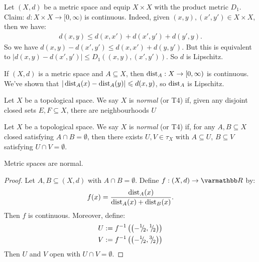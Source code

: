     \begin{example}
        Let $(X,d)$ be a metric space and equip $X \times X$ with the product metric $D_1$. Claim: $d:X \times X \rightarrow [0,\infty)$ is continuous. Indeed, given $(x,y),(x',y') \in X \times X$, then we have:
            \begin{equation*}
            \begin{split}
                d(x,y) \leq d(x,x') + d(x',y') + d(y',y).
            \end{split}
            \end{equation*}
        So we have $d(x,y) - d(x',y') \leq d(x,x') + d(y,y')$. But this is equivalent to $|d(x,y) - d(x',y')| \leq D_1((x,y),(x',y'))$. So $d$ is Lipschitz.
    \end{example}

    \begin{example}
        If $(X,d)$ is a metric space and $A \subseteq X$, then $\operatorname{dist}_A : X \rightarrow [0,\infty)$ is continuous. We've shown that $|\operatorname{dist}_A(x) - \operatorname{dist}_A(y)| \leqslant d(x,y)$, so $\operatorname{dist}_A$ is Lipschitz.
    \end{example}

    \begin{definition}
        Let $X$ be a topological space. We say $X$ is \textit{normal} (or T4) if, given any disjoint closed sets $E,F \subseteq X$, there are neighbourhoods $U$
    \end{definition}

    \begin{definition}
        Let $X$ be a topological space. We say $X$ is \textit{normal} (or T4) if, for any $A,B \subseteq X$ closed satisfying $A \cap B = \emptyset$, then there exists $U,V \in \tau_X$ with $A \subseteq U$, $B \subseteq V$ satisfying $U \cap V = \emptyset$.
    \end{definition}

    \begin{proposition}
        Metric spaces are normal.
    \end{proposition}
        \begin{proof}
            Let $A,B \subseteq (X,d)$ with $A \cap B = \emptyset$. Define $f:(X,d) \rightarrow \bfR$ by:
                \begin{equation*}
                \begin{split}
                    f(x) = \frac{\operatorname{dist}_A(x)}{\operatorname{dist}_A(x) + \operatorname{dist}_B(x)}.
                \end{split}
                \end{equation*}
            Then $f$ is continuous. Moreover, define:
                \begin{equation*}
                \begin{split}
                    U &:= f^{-1}\left(\left(-{}^{1}\mskip -5mu/\mskip -3mu_{2},{}^{1}\mskip -5mu/\mskip -3mu_{2}\right)\right) \\
                    V &:= f^{-1}\left(\left(-{}^{1}\mskip -5mu/\mskip -3mu_{2},{}^{3}\mskip -5mu/\mskip -3mu_{2}\right)\right)
                \end{split}
                \end{equation*}
            Then $U$ and $V$ open with $U \cap V = \emptyset$.
        \end{proof}


